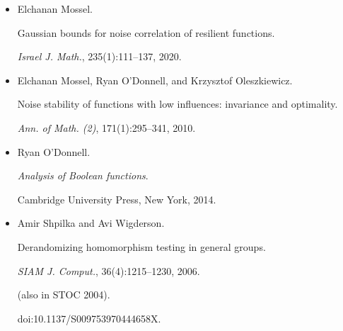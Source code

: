 \begin{itemize}
\item[] 
[26]

Elchanan Mossel.


Gaussian bounds for noise correlation of resilient functions.


\emph{Israel J. Math.}, 235(1):111–137, 2020.





\item[] 
[27]

Elchanan Mossel, Ryan O’Donnell, and Krzysztof Oleszkiewicz.


Noise stability of functions with low influences: invariance and
optimality.


\emph{Ann. of Math. (2)}, 171(1):295–341, 2010.





\item[] 
[28]

Ryan O’Donnell.


\emph{Analysis of Boolean functions}.


Cambridge University Press, New York, 2014.





\item[] 
[29]

Amir Shpilka and Avi Wigderson.


Derandomizing homomorphism testing in general groups.


\emph{SIAM J. Comput.}, 36(4):1215–1230, 2006.


(also in STOC 2004).


doi:10.1137/S009753970444658X.





\end{itemize}

